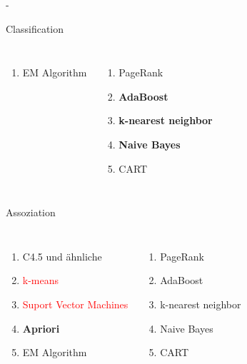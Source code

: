 \documentclass[fleqn,11pt,aspectratio=43]{beamer}
\begin{document}
\begin{frame}{\insertsectionhead - \insertsubsectionhead \cite{wu2008top}}
\begin{block}{\vspace{-0.2em}Classification\vspace{-0.2em}}
\begin{columns}[onlytextwidth]
\begin{enumerate}[label=\bfseries\arabic*.]
		\item EM Algorithm
		\end{enumerate}
	    \begin{enumerate}[label=\bfseries\arabic*.]
	    \setlength{\itemsep}{-5pt}
	    \setcounter{enumi}{5}
	    \item PageRank
	    \item \textbf{AdaBoost}
	    \item \textbf{k-nearest neighbor}
	    \item \textbf{Naive Bayes}
	    \item CART
	    \end{enumerate}
\end{columns}
\vspace{-0.3em}
\end{block}
\pause
\vspace{-0.4em}
\begin{block}{\vspace{-0.2em}Assoziation\vspace{-0.2em}}
\vspace{-1.5em}
\begin{columns}[onlytextwidth]
		\begin{enumerate}[label=\bfseries\arabic*.]
		\setlength{\itemsep}{-5pt}
		\item C4.5 und ähnliche
		\item \textcolor{red}{k-means}
		\item \textcolor{red}{Suport Vector Machines}
		\item \textbf{Apriori}
		\item EM Algorithm
		\end{enumerate}
	    \begin{enumerate}[label=\bfseries\arabic*.]
	    \setlength{\itemsep}{-5pt}
	    \setcounter{enumi}{5}
	    \item PageRank
	    \item AdaBoost
	    \item k-nearest neighbor
	    \item Naive Bayes
	    \item CART
	    \end{enumerate}
\end{columns}
\vspace{-0.3em}
\end{block}
\end{frame}

%
\end{document}
